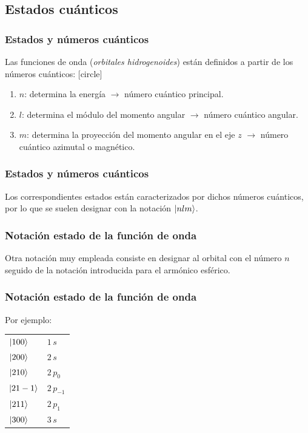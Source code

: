 \documentclass[12pt]{beamer}
\begin{document}
\subsection{Estados cuánticos}

\begin{frame}
\frametitle{Estados y números cuánticos}
Las funciones de onda (\emph{orbitales hidrogenoides}) están definidos a partir de los números cuánticos:
\pause
{}
[circle]
\begin{enumerate}[<+->]
\item $n$: determina la energía $\to$ número cuántico principal.
\item $l$: determina el módulo del momento angular $\to$ número cuántico angular.
\item $m$: determina la proyección del momento angular en el eje $z$ $\to$ número cuántico azimutal o magnético.
\end{enumerate}
\end{frame}
\begin{frame}
\frametitle{Estados y números cuánticos}
Los correspondientes estados están caracterizados por dichos números cuánticos, por lo que se suelen designar con la notación $\ket{n l m}$.
\end{frame}
\begin{frame}
\frametitle{Notación estado de la función de onda}
Otra notación muy empleada consiste en designar al orbital con el número $n$ seguido de la notación introducida para el armónico esférico.
\end{frame}
\begin{frame}
\frametitle{Notación estado de la función de onda}
Por ejemplo:
\pause
\begin{table}[H]
   \renewcommand{\arraystretch}{1.3}
   \centering
   \begin{tabular}{l l}
      $\ket{100}$ & $1 \, s$ \\ \pause
      $\ket{200}$ & $2 \, s$ \\ \pause
      $\ket{210}$ & $2 \, p_{0}$ \\ \pause
      $\ket{21-1}$ & $2 \, p_{-1}$ \\ \pause
      $\ket{211}$ & $2 \, p_{1}$ \\ \pause
      $\ket{300}$ & $3 \, s$ \\
   \end{tabular}
\end{table}
\end{frame}
\end{document}
